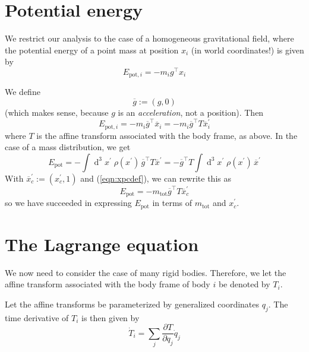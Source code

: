 \documentclass[a4paper]{article}
\begin{document}
\section{Potential energy}
We restrict our analysis to the case of a homogeneous gravitational field, where the potential energy of a point mass at position $x_i$ (in world coordinates!) is given by
\begin{equation}
E_{\mathrm{pot},i} = - m_i g^\top x_i
\end{equation}

We define
\begin{equation}
\overline{g} := (g, 0)
\end{equation}
(which makes sense, because $g$ is an \emph{acceleration}, not a position). Then
\begin{equation}
E_{\mathrm{pot},i} = - m_i \overline{g}^\top \overline{x}_i
= - m_i \overline{g}^\top T \overline{x}^\prime_i
\end{equation}
where $T$ is the affine transform associated with the body frame, as above. In the case of a mass distribution, we get
\begin{equation}
E_\mathrm{pot} = -\int\operatorname{d}^3\!x^\prime\; \rho(x^\prime)\, \overline{g}^\top T \overline{x}^\prime
= -\overline{g}^\top T \int\operatorname{d}^3\!x^\prime\; \rho(x^\prime)\, \overline{x}^\prime
\end{equation}
With $\overline{x}_c^\prime := (x_c^\prime, 1)$ and (\ref{eqn:xpcdef}), we can rewrite this as
\begin{equation}
\label{eqn:epot}
E_\mathrm{pot} = - m_\mathrm{tot} \overline{g}^\top T \overline{x}_c^\prime
\end{equation}
so we have succeeded in expressing $E_\mathrm{pot}$ in terms of $m_\mathrm{tot}$ and $x_c^\prime$.

\section{The Lagrange equation}
We now need to consider the case of many rigid bodies. Therefore, we let the affine transform associated with the body frame of body $i$ be denoted by $T_i$.

Let the affine transforms be parameterized by generalized coordinates $q_j$. The time derivative of $T_i$ is then given by
\begin{equation}
\dot{T}_i = \sum_{j} \frac{\partial T}{\partial q_j} \dot{q}_j
\end{equation}
\end{document}
